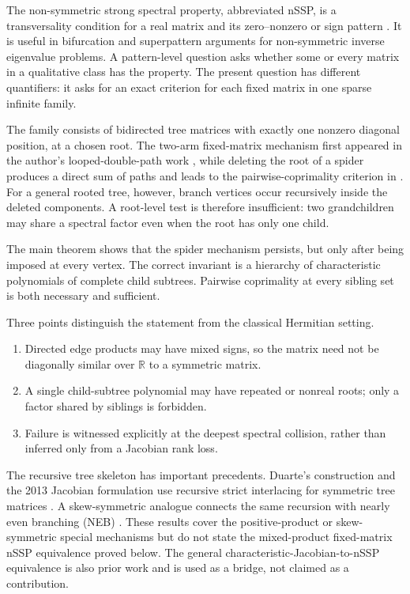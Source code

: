 \documentclass[11pt]{article}
\theoremstyle{remark}
\begin{document}
The non-symmetric strong spectral property, abbreviated nSSP, is a transversality condition for a real matrix and its zero--nonzero or sign pattern \cite{ref1,ref2,ref11}. It is useful in bifurcation and superpattern arguments for non-symmetric inverse eigenvalue problems. A pattern-level question asks whether some or every matrix in a qualitative class has the property. The present question has different quantifiers: it asks for an exact criterion for each fixed matrix in one sparse infinite family.

The family consists of bidirected tree matrices with exactly one nonzero diagonal position, at a chosen root. The two-arm fixed-matrix mechanism first appeared in the author's looped-double-path work \cite{ref12}, while deleting the root of a spider produces a direct sum of paths and leads to the pairwise-coprimality criterion in \cite{ref7}. For a general rooted tree, however, branch vertices occur recursively inside the deleted components. A root-level test is therefore insufficient: two grandchildren may share a spectral factor even when the root has only one child.

The main theorem shows that the spider mechanism persists, but only after being imposed at every vertex. The correct invariant is a hierarchy of characteristic polynomials of complete child subtrees. Pairwise coprimality at every sibling set is both necessary and sufficient.

Three points distinguish the statement from the classical Hermitian setting.

\begin{enumerate}
\item Directed edge products may have mixed signs, so the matrix need not be diagonally similar over $\mathbb R$ to a symmetric matrix.
\item A single child-subtree polynomial may have repeated or nonreal roots; only a factor shared by siblings is forbidden.
\item Failure is witnessed explicitly at the deepest spectral collision, rather than inferred only from a Jacobian rank loss.
\end{enumerate}


The recursive tree skeleton has important precedents. Duarte's construction and the 2013 Jacobian formulation use recursive strict interlacing for symmetric tree matrices \cite{ref3,ref8}. A skew-symmetric analogue connects the same recursion with nearly even branching (NEB) \cite{ref4}. These results cover the positive-product or skew-symmetric special mechanisms but do not state the mixed-product fixed-matrix nSSP equivalence proved below. The general characteristic-Jacobian-to-nSSP equivalence is also prior work \cite[Theorem 5.1]{ref1} and is used as a bridge, not claimed as a contribution.
\end{document}
